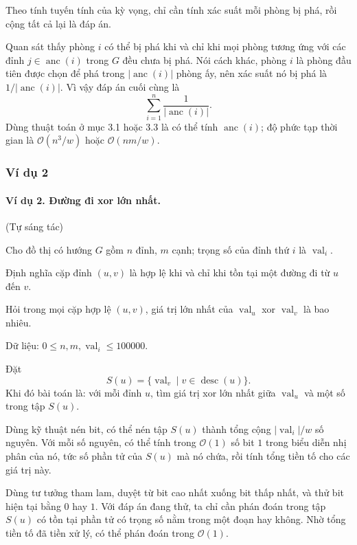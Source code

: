 \documentclass[11pt]{article}
\newcommand{\Oh}{\mathcal{O}}
\begin{document}
Theo tính tuyến tính của kỳ vọng, chỉ cần tính xác suất mỗi phòng bị phá, rồi
cộng tất cả lại là đáp án.

Quan sát thấy phòng \(i\) có thể bị phá khi và chỉ khi mọi phòng tương ứng với
các đỉnh \(j\in\operatorname{anc}(i)\) trong \(G\) đều chưa bị phá. Nói cách
khác, phòng \(i\) là phòng đầu tiên được chọn để phá trong
\(|\operatorname{anc}(i)|\) phòng ấy, nên xác suất nó bị phá là
\(1/|\operatorname{anc}(i)|\). Vì vậy đáp án cuối cùng là
\[
  \sum_{i=1}^{n}\frac{1}{|\operatorname{anc}(i)|}.
\]
Dùng thuật toán ở mục 3.1 hoặc 3.3 là có thể tính \(\operatorname{anc}(i)\);
độ phức tạp thời gian là \(\Oh(n^3/w)\) hoặc \(\Oh(nm/w)\).

\subsubsection{Ví dụ 2}

\paragraph{Ví dụ 2. Đường đi xor lớn nhất.}
(Tự sáng tác)

Cho đồ thị có hướng \(G\) gồm \(n\) đỉnh, \(m\) cạnh; trọng số của đỉnh thứ
\(i\) là \(\operatorname{val}_i\).

Định nghĩa cặp đỉnh \((u,v)\) là hợp lệ khi và chỉ khi tồn tại một đường đi từ
\(u\) đến \(v\).

Hỏi trong mọi cặp hợp lệ \((u,v)\), giá trị lớn nhất của
\(\operatorname{val}_u\) xor \(\operatorname{val}_v\) là bao nhiêu.

Dữ liệu: \(0\le n,m,\operatorname{val}_i\le 100000\).

Đặt
\[
  S(u)=\{\operatorname{val}_v\mid v\in\operatorname{desc}(u)\}.
\]
Khi đó bài toán là: với mỗi đỉnh \(u\), tìm giá trị xor lớn nhất giữa
\(\operatorname{val}_u\) và một số trong tập \(S(u)\).

Dùng kỹ thuật nén bit, có thể nén tập \(S(u)\) thành tổng cộng
\(|\operatorname{val}_i|/w\) số nguyên. Với mỗi số nguyên, có thể tính trong
\(\Oh(1)\) số bit \(1\) trong biểu diễn nhị phân của nó, tức số phần tử của
\(S(u)\) mà nó chứa, rồi tính tổng tiền tố cho các giá trị này.

Dùng tư tưởng tham lam, duyệt từ bit cao nhất xuống bit thấp nhất, và thử bit
hiện tại bằng \(0\) hay \(1\). Với đáp án đang thử, ta chỉ cần phán đoán trong
tập \(S(u)\) có tồn tại phần tử có trọng số nằm trong một đoạn hay không. Nhờ
tổng tiền tố đã tiền xử lý, có thể phán đoán trong \(\Oh(1)\).
\end{document}
